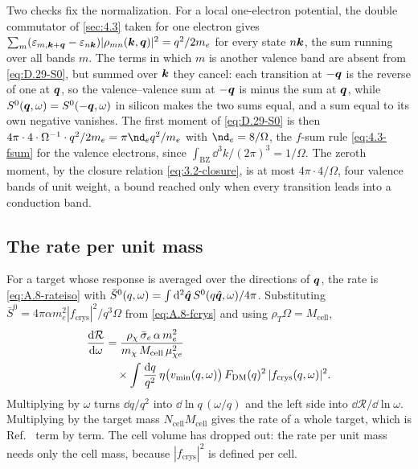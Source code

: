 Two checks fix the normalization. For a local one-electron potential, the double commutator of \cref{sec:4.3} taken for one electron gives $\sum_m(\varepsilon_{m,\bm{k}+\bm{q}} - \varepsilon_{n\bm{k}})|\rho_{mn}(\bm{k},\bm{q})|^2 = q^2/2m_e$ for every state $n\bm{k}$, the sum running over all bands $m$. The terms in which $m$ is another valence band are absent from \cref{eq:D.29-S0}, but summed over $\bm{k}$ they cancel: each transition at $-\bm{q}$ is the reverse of one at $\bm{q}$, so the valence--valence sum at $-\bm{q}$ is minus the sum at $\bm{q}$, while $S^0(\bm{q},\omega) = S^0(-\bm{q},\omega)$ in silicon makes the two sums equal, and a sum equal to its own negative vanishes. The first moment of \cref{eq:D.29-S0} is then $4\pi\cdot4\cdot\Omega^{-1}\cdot q^2/2m_e = \pi\nd_eq^2/m_e$ with $\nd_e = 8/\Omega$, the $f$-sum rule \cref{eq:4.3-fsum} for the valence electrons, since $\int_{\mathrm{BZ}}\dd^3k/(2\pi)^3 = 1/\Omega$. The zeroth moment, by the closure relation \cref{eq:3.2-closure}, is at most $4\pi\cdot4/\Omega$, four valence bands of unit weight, a bound reached only when every transition leads into a conduction band.

\subsection{The rate per unit mass}

For a target whose response is averaged over the directions of $\bm{q}$, the rate is \cref{eq:A.8-rateiso} with $\bar S^0(q,\omega) = \int\mathrm{d}^2\hat{\bm{q}}\,S^0(q\hat{\bm{q}},\omega)/4\pi$. Substituting $\bar S^0 = 4\pi\alpha m_e^2|f_{\mathrm{crys}}|^2/q^3\Omega$ from \cref{eq:A.8-fcrys} and using $\rho_T\Omega = M_{\mathrm{cell}}$,
\begin{equation}
  \begin{aligned}
  \frac{\mathrm{d}\mathcal{R}}{\mathrm{d}\omega} &= \frac{\rho_\chi\,\bar{\sigma}_{e}\,\alpha\,m_e^2}{m_{\chi}\,M_{\mathrm{cell}}\,\mu_{\chi e}^2} \\
  &\quad\times\int\frac{\mathrm{d} q}{q^2}\,\eta\bigl(v_{\mathrm{min}}(q,\omega)\bigr)\,F_{\mathrm{DM}}(q)^2\,|f_{\mathrm{crys}}(q,\omega)|^2 .
  \end{aligned}
  \label{eq:D.29-rate}
\end{equation}
Multiplying by $\omega$ turns $\dd q/q^2$ into $\dd\ln q\,(\omega/q)$ and the left side into $\dd\mathcal{R}/\dd\ln\omega$. Multiplying by the target mass $N_{\mathrm{cell}}M_{\mathrm{cell}}$ gives the rate of a whole target, which is Ref.~\cite[Eq.~(3.13)]{essig2016direct} term by term. The cell volume has dropped out: the rate per unit mass needs only the cell mass, because $|f_{\mathrm{crys}}|^2$ is defined per cell.

